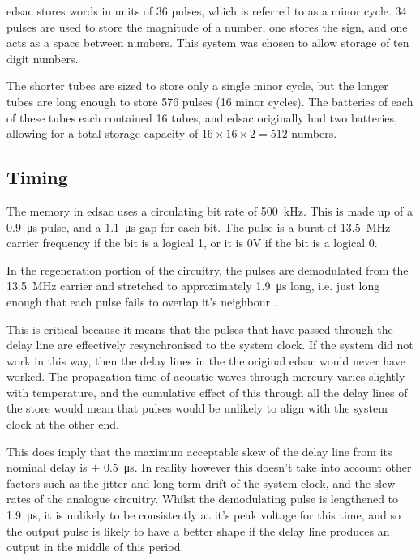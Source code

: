 \Gls{edsac} stores words in units of 36 pulses, which is referred to as a minor cycle. 34 pulses are used to store the magnitude of a number, one stores the sign, and one acts as a space between numbers. This system was chosen to allow storage of ten digit numbers. 

The shorter tubes are sized to store only a single minor cycle, but the longer tubes are long enough to store 576 pulses (16 minor cycles). The batteries of each of these tubes each contained 16 tubes, and \gls{edsac} originally had two batteries, allowing for a total storage capacity of $16 \times 16 \times 2 = 512$ numbers.

\subsection{Timing}
The memory in \gls{edsac} uses a circulating bit rate of \SI{500}{\kilo\hertz}. This is made up of a \SI{0.9}{\micro\second} pulse, and a \SI{1.1}{\micro\second} gap for each bit. The pulse is a burst of \SI{13.5}{\mega\hertz} carrier frequency if the bit is a logical 1, or it is 0V if the bit is a logical 0.

In the regeneration portion of the circuitry, the pulses are demodulated from the \SI{13.5}{\mega\hertz} carrier and stretched to approximately \SI{1.9}{\micro\second} long, i.e. just long enough that each pulse fails to overlap it's neighbour \cite[p.212]{wilkes1948}.

This is critical because it means that the pulses that have passed through the delay line are effectively resynchronised to the system clock. If the system did not work in this way, then the delay lines in the the original \gls{edsac} would never have worked. The propagation time of acoustic waves through mercury varies slightly with temperature, and the cumulative effect of this through all the delay lines of the store would mean that pulses would be unlikely to align with the system clock at the other end.

This does imply that the maximum acceptable skew of the delay line from its nominal delay is $\pm$ \SI{0.5}{\micro\second}. In reality however this doesn't take into account other factors such as the jitter and long term drift of the system clock, and the slew rates of the analogue circuitry. Whilst the demodulating pulse is lengthened to \SI{1.9}{\micro\second}, it is unlikely to be consistently at it's peak voltage for this time, and so the output pulse is likely to have a better shape if the delay line produces an output in the middle of this period.

